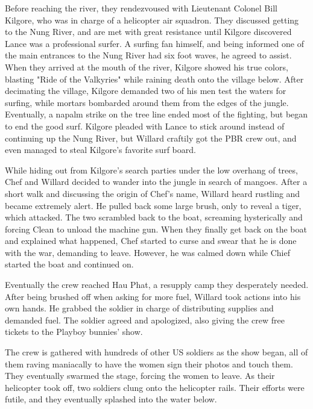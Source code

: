 \documentclass[a4paper,man,natbib]{apa6}
\begin{document}
Before reaching the river, they rendezvoused with Lieutenant Colonel Bill Kilgore, who was in charge of a helicopter air squadron. They discussed getting to the Nung River, and are met with great resistance until Kilgore discovered Lance was a professional surfer. A surfing fan himself, and being informed one of the main entrances to the Nung River had six foot waves, he agreed to assist. When they arrived at the mouth of the river, Kilgore showed his true colors, blasting "Ride of the Valkyries" while raining death onto the village below. After decimating the village, Kilgore demanded two of his men test the waters for surfing, while mortars bombarded around them from the edges of the jungle. Eventually, a napalm strike on the tree line ended most of the fighting, but began to end the good surf. Kilgore pleaded with Lance to stick around instead of continuing up the Nung River, but Willard craftily got the PBR crew out, and even managed to steal Kilgore's favorite surf board.

While hiding out from Kilgore's search parties under the low overhang of trees, Chef and Willard decided to wander into the jungle in search of mangoes. After a short walk and discussing the origin of Chef's name, Willard heard rustling and became extremely alert. He pulled back some large brush, only to reveal a tiger, which attacked. The two scrambled back to the boat, screaming hysterically and forcing Clean to unload the machine gun. When they finally get back on the boat and explained what happened, Chef started to curse and swear that he is done with the war, demanding to leave. However, he was calmed down while Chief started the boat and continued on. 

Eventually the crew reached Hau Phat, a resupply camp they desperately needed. After being brushed off when asking for more fuel, Willard took actions into his own hands. He grabbed the soldier in charge of distributing supplies and demanded fuel. The soldier agreed and apologized, also giving the crew free tickets to the Playboy bunnies' show.

The crew is gathered with hundreds of other US soldiers as the show began, all of them raving maniacally to have the women sign their photos and touch them. They eventually swarmed the stage, forcing the women to leave. As their helicopter took off, two soldiers clung onto the helicopter rails. Their efforts were futile, and they eventually splashed into the water below.
\end{document}
